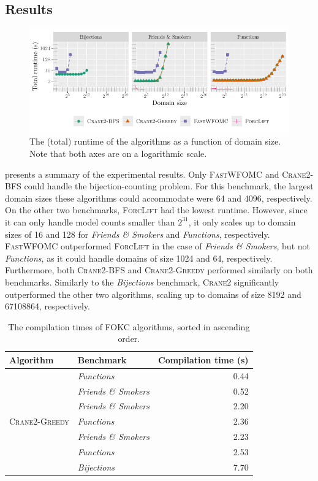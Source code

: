 \documentclass[a4paper,UKenglish,cleveref,autoref,table]{lipics-v2021}
\newcommand{\Cranetwo}{\textsc{Crane2}}
\newcommand{\Cranebfs}{\textsc{Crane2-BFS}}
\newcommand{\Cranegreedy}{\textsc{Crane2-Greedy}}
\newcommand{\friends}{\emph{Friends \& Smokers}}
\newcommand{\functions}{\emph{Functions}}
\newcommand{\bijections}{\emph{Bijections}}
\begin{document}
\subsection{Results}

\begin{figure}[t]
  \centering
  \includegraphics{plot.pdf}
  \caption{The (total) runtime of the algorithms as a function of domain size.
    Note that both axes are on a logarithmic scale.}\label{fig:plot}
\end{figure}

 presents a summary of the experimental results. Only
\textsc{FastWFOMC} and \Cranebfs{} could handle the bijection-counting problem.
For this benchmark, the largest domain sizes these algorithms could accommodate
were \num{64} and \num{4096}, respectively. On the other two benchmarks,
\textsc{ForcLift} had the lowest runtime. However, since it can only handle
model counts smaller than $2^{31}$, it only scales up to domain sizes of
\num{16} and \num{128} for \friends{} and \functions{}, respectively.
\textsc{FastWFOMC} outperformed \textsc{ForcLift} in the case of \friends{}, but
not \functions{}, as it could handle domains of size \num{1024} and \num{64},
respectively. Furthermore, both \Cranebfs{} and \Cranegreedy{} performed
similarly on both benchmarks. Similarly to the \bijections{} benchmark,
\Cranetwo{} significantly outperformed the other two algorithms, scaling up to
domains of size \num{8192} and \num{67108864}, respectively.

\begin{table}[t]
  \caption{The compilation times of FOKC algorithms, sorted in ascending
    order.}\label{tbl:compilation}
  \centering
  \begin{tabular}{llr}
    \toprule
    Algorithm & Benchmark & Compilation time (s)\\
    \midrule
    \rowcolor{gray!10}
              & \functions{} & 0.44\\
    \rowcolor{gray!10}
    \multirow{-2}{*}{\textsc{ForcLift}} & \friends{} & 0.52\\
              & \friends{} & 2.20\\
    \multirow{-2}{*}{\Cranegreedy{}} & \functions{} & 2.36\\
    \rowcolor{gray!10}
              & \friends{} & 2.23\\
    \rowcolor{gray!10}
              & \functions{} & 2.53\\
    \rowcolor{gray!10}
    \multirow{-3}{*}{\Cranebfs{}} & \bijections{} & 7.70\\
  \end{tabular}
\end{table}
\end{document}
